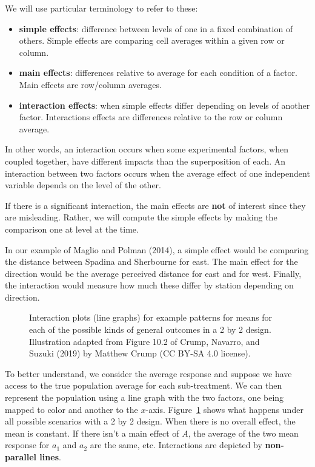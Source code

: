 \documentclass[
  11pt,
  letterpaper,
]{scrbook}
\providecommand{\tightlist}{%
  \setlength{\itemsep}{0pt}\setlength{\parskip}{0pt}}\usepackage{longtable,booktabs,array}
\theoremstyle{definition}
\theoremstyle{definition}
\theoremstyle{remark}
\begin{document}
We will use particular terminology to refer to these:

\begin{itemize}
\tightlist
\item
  \textbf{simple effects}: difference between levels of one in a fixed
  combination of others. Simple effects are comparing cell averages
  within a given row or column.
\item
  \textbf{main effects}: differences relative to average for each
  condition of a factor. Main effects are row/column averages.
\item
  \textbf{interaction effects}: when simple effects differ depending on
  levels of another factor. Interactions effects are differences
  relative to the row or column average.
\end{itemize}

In other words, an interaction occurs when some experimental factors,
when coupled together, have different impacts than the superposition of
each. An interaction between two factors occurs when the average effect
of one independent variable depends on the level of the other.

If there is a significant interaction, the main effects are \textbf{not}
of interest since they are misleading. Rather, we will compute the
simple effects by making the comparison one at level at the time.

In our example of Maglio and Polman (2014), a simple effect would be
comparing the distance between Spadina and Sherbourne for east. The main
effect for the direction would be the average perceived distance for
east and for west. Finally, the interaction would measure how much these
differ by station depending on direction.

\begin{figure}[ht!]


\caption{\label{fig-2by2}Interaction plots (line graphs) for example
patterns for means for each of the possible kinds of general outcomes in
a 2 by 2 design. Illustration adapted from Figure 10.2 of Crump,
Navarro, and Suzuki (2019) by Matthew Crump (CC BY-SA 4.0 license).}

\end{figure}%

To better understand, we consider the average response and suppose we
have access to the true population average for each sub-treatment. We
can then represent the population using a line graph with the two
factors, one being mapped to color and another to the \(x\)-axis.
Figure~\ref{fig-2by2} shows what happens under all possible scenarios
with a 2 by 2 design. When there is no overall effect, the mean is
constant. If there isn't a main effect of \(A\), the average of the two
mean response for \(a_1\) and \(a_2\) are the same, etc. Interactions
are depicted by \textbf{non-parallel lines}.
\end{document}
